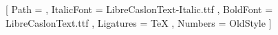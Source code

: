 \setmainfont{LibreCaslonText.ttf}[
  Path = \fontdir , ItalicFont = LibreCaslonText-Italic.ttf ,
  BoldFont = LibreCaslonText.ttf , Ligatures = TeX ,
  Numbers = OldStyle ]

